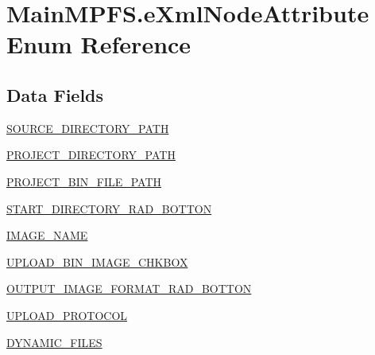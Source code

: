 \hypertarget{enum_microchip_m_p_f_s_1_1_main_m_p_f_s_1_1e_xml_node_attribute}{}\section{Main\+M\+P\+F\+S.\+e\+Xml\+Node\+Attribute Enum Reference}
\label{enum_microchip_m_p_f_s_1_1_main_m_p_f_s_1_1e_xml_node_attribute}
\subsection*{Data Fields}
\begin{DoxyCompactItemize}
\item 
\hyperlink{enum_microchip_m_p_f_s_1_1_main_m_p_f_s_1_1e_xml_node_attribute_a2af0bf89d7f51387d927c691b281efb5}{S\+O\+U\+R\+C\+E\+\_\+\+D\+I\+R\+E\+C\+T\+O\+R\+Y\+\_\+\+P\+A\+T\+H}
\item 
\hyperlink{enum_microchip_m_p_f_s_1_1_main_m_p_f_s_1_1e_xml_node_attribute_aee7e43ea57d18b1cbf266fb530b4592a}{P\+R\+O\+J\+E\+C\+T\+\_\+\+D\+I\+R\+E\+C\+T\+O\+R\+Y\+\_\+\+P\+A\+T\+H}
\item 
\hyperlink{enum_microchip_m_p_f_s_1_1_main_m_p_f_s_1_1e_xml_node_attribute_ab5f684af9d7749be6bc6e03aeba5ea75}{P\+R\+O\+J\+E\+C\+T\+\_\+\+B\+I\+N\+\_\+\+F\+I\+L\+E\+\_\+\+P\+A\+T\+H}
\item 
\hyperlink{enum_microchip_m_p_f_s_1_1_main_m_p_f_s_1_1e_xml_node_attribute_ad119a9201576cfd8fb6147dba31f979a}{S\+T\+A\+R\+T\+\_\+\+D\+I\+R\+E\+C\+T\+O\+R\+Y\+\_\+\+R\+A\+D\+\_\+\+B\+O\+T\+T\+O\+N}
\item 
\hyperlink{enum_microchip_m_p_f_s_1_1_main_m_p_f_s_1_1e_xml_node_attribute_ab974beb289efa05661ea5e45c6a12736}{I\+M\+A\+G\+E\+\_\+\+N\+A\+M\+E}
\item 
\hyperlink{enum_microchip_m_p_f_s_1_1_main_m_p_f_s_1_1e_xml_node_attribute_aefe822c3f228f6f2fa6526156749de20}{U\+P\+L\+O\+A\+D\+\_\+\+B\+I\+N\+\_\+\+I\+M\+A\+G\+E\+\_\+\+C\+H\+K\+B\+O\+X}
\item 
\hyperlink{enum_microchip_m_p_f_s_1_1_main_m_p_f_s_1_1e_xml_node_attribute_a54dca6b1d948bc235ee322249529a5e6}{O\+U\+T\+P\+U\+T\+\_\+\+I\+M\+A\+G\+E\+\_\+\+F\+O\+R\+M\+A\+T\+\_\+\+R\+A\+D\+\_\+\+B\+O\+T\+T\+O\+N}
\item 
\hyperlink{enum_microchip_m_p_f_s_1_1_main_m_p_f_s_1_1e_xml_node_attribute_ad328a722790f60a0405133e8345f292f}{U\+P\+L\+O\+A\+D\+\_\+\+P\+R\+O\+T\+O\+C\+O\+L}
\item 
\hyperlink{enum_microchip_m_p_f_s_1_1_main_m_p_f_s_1_1e_xml_node_attribute_a6b7d361f5c7d3210c1920d1b1607ab2c}{D\+Y\+N\+A\+M\+I\+C\+\_\+\+F\+I\+L\+E\+S}

\end{DoxyCompactItemize}
